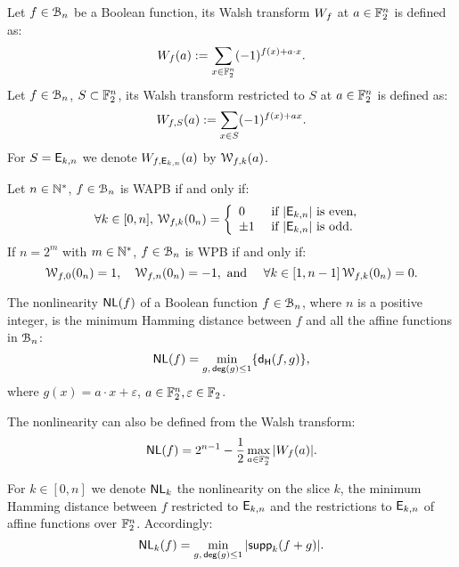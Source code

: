 \documentclass[11pt]{llncs}
\begin{document}
\begin{definition}\label{def:walsh_transform}
	Let $f\in \mathcal{B}_{n}$ be a Boolean function, its Walsh transform $W_{f}$ at $a \in \mathbb{F}_2^n$ is defined as:
	\[  W_{f} (a) := \sum_{x \in \mathbb{F}_2^n} (-1)^{f(x) +  a \cdot x }.\]
	Let $f\in \mathcal{B}_{n}$, $S \subset \mathbb{F}_2^n$, its Walsh transform restricted to $S$ at $a \in \mathbb{F}_2^n$ is defined as:
	\[  W_{f,S} (a) := \sum_{x\in S} (-1)^{f(x)+ax}.\]
	For $S=\mathsf{E}_{k,n}$ we denote $W_{f,\mathsf{E}_{k,n}} (a)$ by $\mathcal{W}_{f,k}(a)$.%
	
\end{definition}

\begin{Prop}\label{prop:WAPBWalsh}
	
Let $n\in \mathbb{N}^*$, $f\in \mathcal{B}_{n}$ is WAPB if and only if:
\[\forall k \in [0,n], \, \mathcal{W}_{f,k}(0_n)=   
\left \{
\begin{array}{l l}
0  & \text{ if } |\mathsf{E}_{k,n}| \text{ is even, } \\
\pm 1 & \text{ if }  |\mathsf{E}_{k,n}| \text{ is odd.}
\end{array}\right. \] 
If $n=2^m$ with $m\in \mathbb{N}^*$, $f\in \mathcal{B}_{n}$ is WPB if and only if:
\[\mathcal{W}_{f,0}(0_n)=1, \quad \mathcal{W}_{f,n}(0_n)=-1, \text{ and } \quad \forall k \in [1,n-1] \,  \mathcal{W}_{f,k}(0_n)=0. \] 
	
\end{Prop}

\begin{definition} \label{def:nl}
	The nonlinearity $\mathsf{NL}(f)$ of a Boolean function $f\in \mathcal{B}_n$, where $n$ is a positive integer, is the minimum Hamming distance between $f$ and all the affine functions in $\mathcal{B}_n$:
	\[ \mathsf{NL}(f) = \min_{g,\, \mathsf{deg}(g)\leq 1} \{ \mathsf{d_H}(f,g) \}{,} \]
	where $g(x)=a\cdot x+\varepsilon$, $a\in \mathbb{F}_2^n, \varepsilon\in \mathbb{F}_2$. 
	
	The nonlinearity can also be defined from the Walsh transform:
	\[ \mathsf{NL}(f) = 2^{n-1}- \frac{1}{2} \max_{a\in \mathbb{F}_2^n}{|W_{f}(a)|}. \]
	
	
	For $k\in [0,n]$ we denote $\mathsf{NL}_{k}$ the nonlinearity on the slice $k$, the minimum Hamming distance between $f$ restricted to $\mathsf{E}_{k,n}$ and the restrictions to $\mathsf{E}_{k,n}$ of affine functions over $\mathbb{F}_2^n$. 
	Accordingly: 
	\[\mathsf{NL}_{k}(f)=\min_{g,\, \mathsf{deg}(g)\leq 1} |\mathsf{supp}_{k}(f+g)|.\]
\end{definition}
\end{document}
